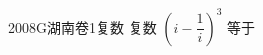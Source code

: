 
\begin{problem}{2008}{G}{湖南卷}{1}{复数}
复数 $\left(i-\dfrac{1}{i}\right)^3$ 等于
\begin{choices}
\end{choices}
\end{problem}

\begin{answer}

\end{answer}

\begin{solutions}

\end{solutions}